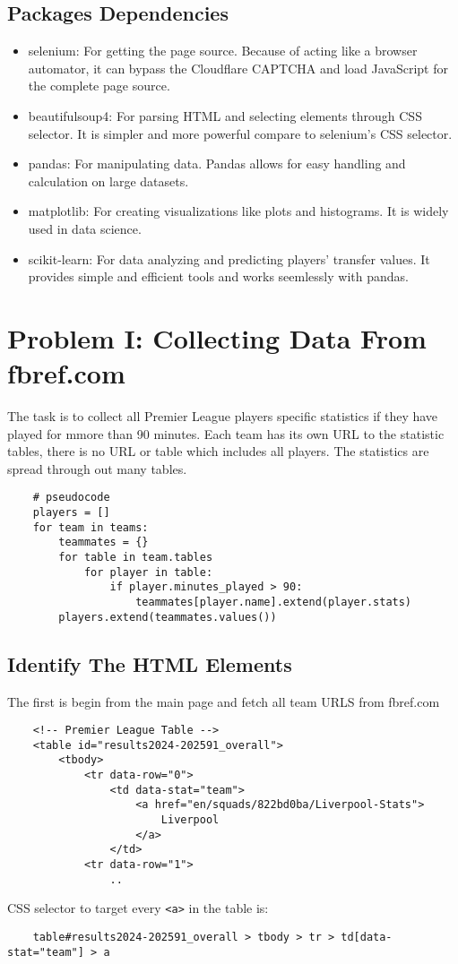 \documentclass{report}
\begin{document}
\subsection{Packages Dependencies}
\begin{itemize}
    \item selenium: For getting the page source. Because of acting like a
    browser automator, it can bypass the Cloudflare CAPTCHA and load JavaScript for the 
    complete page source.
    \item beautifulsoup4: For parsing HTML and selecting elements through CSS 
    selector. It is simpler and more powerful compare to selenium's CSS selector.
    \item pandas: For manipulating data. Pandas allows for easy handling and 
    calculation on large datasets. 
    \item matplotlib: For creating visualizations like plots and histograms. 
    It is widely used in data science.
    \item scikit-learn: For data analyzing and predicting players' transfer values. 
    It provides simple and efficient tools and works seemlessly with pandas.
\end{itemize}

\section{Problem I: Collecting Data From fbref.com}
The task is to collect all Premier League players specific statistics if they have played for 
mmore than 90 minutes. Each team has its own URL to the statistic tables, there is no URL or 
table which includes all players. The statistics are spread through out many tables.
\begin{verbatim}
    # pseudocode
    players = []
    for team in teams:
        teammates = {}
        for table in team.tables
            for player in table:
                if player.minutes_played > 90:
                    teammates[player.name].extend(player.stats)
        players.extend(teammates.values())
\end{verbatim}

\subsection{Identify The HTML Elements}
The first is begin from the main page and fetch all team URLS from fbref.com
\begin{verbatim}
    <!-- Premier League Table -->
    <table id="results2024-202591_overall">
        <tbody>
            <tr data-row="0">
                <td data-stat="team">
                    <a href="en/squads/822bd0ba/Liverpool-Stats">
                        Liverpool
                    </a>
                </td>
            <tr data-row="1">
                ..
\end{verbatim}
CSS selector to target every \verb|<a>| in the table is:
\begin{verbatim}
    table#results2024-202591_overall > tbody > tr > td[data-stat="team"] > a    
\end{verbatim}
\end{document}
